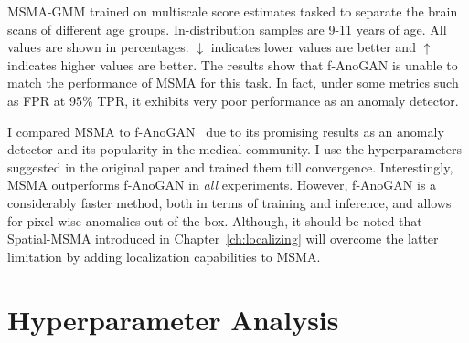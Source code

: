 \begin{table}[tbhp]
\caption{MSMA-GMM trained on multiscale score estimates tasked to separate the brain scans of different age groups. In-distribution samples are 9-11 years of age. All values are shown in percentages. $\downarrow$ indicates lower values are better and $\uparrow$ indicates higher values are better. The results show that f-AnoGAN is unable to match the performance of MSMA for this task. In fact, under some metrics such as FPR at 95\% TPR, it exhibits very poor performance as an anomaly detector.}

\label{brain_perf}
\end{table}

I compared MSMA to f-AnoGAN~\cite{schlegl2019f} due to its promising results as an anomaly detector and its popularity in the medical community. I use the hyperparameters suggested in the original paper and trained them till convergence. Interestingly, MSMA outperforms f-AnoGAN in \textit{all} experiments. However, f-AnoGAN is a considerably faster method, both in terms of training and inference, and allows for pixel-wise anomalies out of the box. Although, it should be noted that Spatial-MSMA introduced in Chapter~\ref{ch:localizing} will overcome the latter limitation by adding localization capabilities to MSMA.


\section{Hyperparameter Analysis}
\label{hyperparams}

